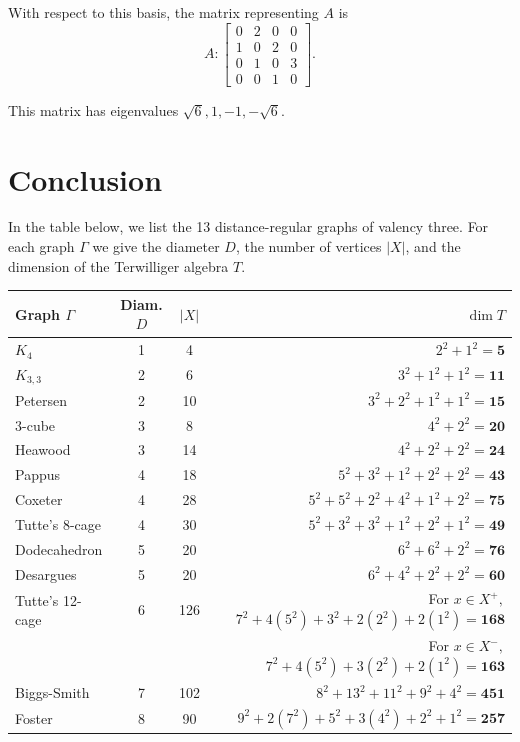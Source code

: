 \documentclass[12pt,letterpaper]{article}
\begin{document}
With respect to this basis, the matrix representing $A$ is
\begin{equation}
    A: \begin{bmatrix}
  0 & 2 & 0 & 0 \\
  1 & 0 & 2 & 0 \\
  0 & 1 & 0 & 3 \\
  0 & 0 & 1 & 0 \end{bmatrix}.
\label{eq:fos-IX}
\end{equation}

This matrix has eigenvalues $\sqrt{6}, 1, -1, -\sqrt{6}$.

\section{Conclusion}\label{sec:conclusion}

In the table below, we list the 13 distance-regular graphs of valency three. For each graph $\Gamma$ we give the diameter $D$, the number of vertices $|X|$, and the dimension of the Terwilliger algebra $T$.


\begin{center}
\begin{tabular}{lccr}
    \toprule
       Graph $\Gamma$ & Diam. $D$& $|X|$ & $\dim T$ \\
       \midrule
       $K_4$ &1& 4  & $2^2+1^2= \mathbf 5$ \\
    $K_{3,3}$ &2& 6 & $3^2 +1^2+1^2 =\mathbf {11}$ \\
    Petersen &2& 10   & $3^2+2^2+1^2 +1^2 =\mathbf{15}$ \\
    $3$-cube &3& 8 & $4^2+2^2=\mathbf{20}$ \\   
    Heawood &3& 14   & $4^2+2^2+2^2=\mathbf{24}$ \\
    Pappus &4& 18  & $5^2+3^2+1^2 +2^2+2^2 =\mathbf{43}$\\
    Coxeter &4& 28    & $5^2+5^2+2^2+4^2+1^2+2^2=\mathbf{75}$\\
    Tutte's 8-cage &4& 30   & $5^2+3^2+3^2+1^2+2^2+1^2=\mathbf{49}$ \\
    Dodecahedron &5& 20   & $6^2+6^2+2^2=\mathbf{76}$ \\
    Desargues &5& 20    & $6^2+4^2+2^2+2^2=\mathbf{60}$ \\
    Tutte's 12-cage &6& 126    & For $x\in X^+,$ \text{ }\hfill $7^2 + 4  (5^2) + 3^2 +2 (2^2) +2 (1^2)=\mathbf{168}$ \\
     &&&For $x\in X^-,$ \hfill $7^2 + 4  (5^2) +3 (2^2) +2 (1^2)=\mathbf{163}$ \\
        Biggs-Smith &7& 102   & $8^2+13^2 +11^2+9^2+4^2=\mathbf{451}$ \\
    Foster &8& 90    & $9^2+2(7^2)+5^2+3(4^2)+2^2+1^2=\mathbf{257}$ \\
    \bottomrule
    \end{tabular}
\end{center}
\end{document}
